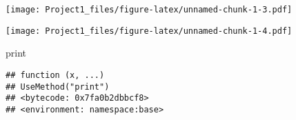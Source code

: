 \documentclass[
]{article}
\newenvironment{Shaded}{\begin{snugshade}}{\end{snugshade}}
\newcommand{\AttributeTok}[1]{\textcolor[rgb]{0.77,0.63,0.00}{#1}}
\newcommand{\DecValTok}[1]{\textcolor[rgb]{0.00,0.00,0.81}{#1}}
\newcommand{\FunctionTok}[1]{\textcolor[rgb]{0.00,0.00,0.00}{#1}}
\newcommand{\NormalTok}[1]{#1}
\newcommand{\SpecialCharTok}[1]{\textcolor[rgb]{0.00,0.00,0.00}{#1}}
\newcommand{\StringTok}[1]{\textcolor[rgb]{0.31,0.60,0.02}{#1}}
\begin{document}
\texttt{[image: Project1\_files/figure-latex/unnamed-chunk-1-3.pdf]}

\begin{Shaded}
\end{Shaded}

\texttt{[image: Project1\_files/figure-latex/unnamed-chunk-1-4.pdf]}

\begin{Shaded}
\begin{Highlighting}[]
\NormalTok{print}
\end{Highlighting}
\end{Shaded}

\begin{verbatim}
## function (x, ...) 
## UseMethod("print")
## <bytecode: 0x7fa0b2dbbcf8>
## <environment: namespace:base>
\end{verbatim}
\end{document}
